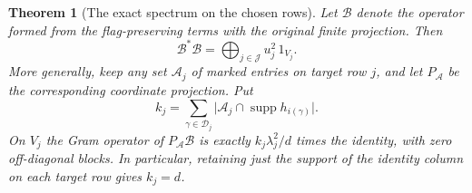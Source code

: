 \documentclass[a4paper,11pt]{article}
\newtheorem{theorem}[proposition]{Theorem}
\theoremstyle{definition}
\theoremstyle{remark}
\numberwithin{equation}{section}
\begin{document}
\begin{theorem}[The exact spectrum on the chosen rows]
\leavevmode\label{thm:flagisometry544}
Let \(\mathcal B\) denote the operator formed from the
flag-preserving terms with the original finite projection.
Then
\[
            \mathcal B^*\mathcal B=
            \bigoplus_{j\in\mathcal J} u_j^2\,1_{V_j}.
\]
More generally, keep any set \(\mathcal A_j\) of marked entries
on target row \(j\), and let \(P_{\mathcal A}\) be the
corresponding coordinate projection. Put
\[
       k_j=\sum_{\gamma\in\mathcal D_j}
         \big|\mathcal A_j\cap\operatorname{supp}h_{i(\gamma)}\big|.
\]
On \(V_j\) the Gram operator of \(P_{\mathcal A}\mathcal B\)
is exactly \(k_j\lambda_j^2/d\) times the identity, with zero
off-diagonal blocks. In particular, retaining just the support
of the identity column on each target row gives \(k_j=d\).
\end{theorem}
\end{document}
